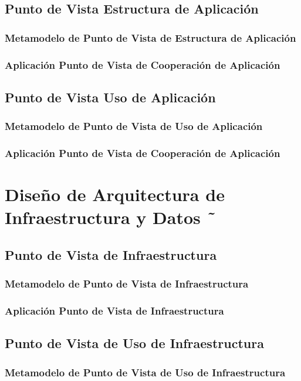       \subsection{Punto de Vista Estructura de Aplicación}
      \subsubsection{Metamodelo de Punto de Vista de Estructura de Aplicación}
      \subsubsection{Aplicación Punto de Vista de Cooperación de Aplicación}
      \subsection{Punto de Vista Uso de Aplicación}
      \subsubsection{Metamodelo de Punto de Vista de Uso de Aplicación}
      \subsubsection{Aplicación Punto de Vista de Cooperación de Aplicación}
     \section{Diseño de Arquitectura de Infraestructura y Datos ˜}
      \subsection{Punto de Vista de Infraestructura}
      \subsubsection{Metamodelo de Punto de Vista de Infraestructura}
      \subsubsection{Aplicación Punto de Vista de Infraestructura}
      \subsection{Punto de Vista de Uso de Infraestructura}
      \subsubsection{Metamodelo de Punto de Vista de Uso de Infraestructura}
